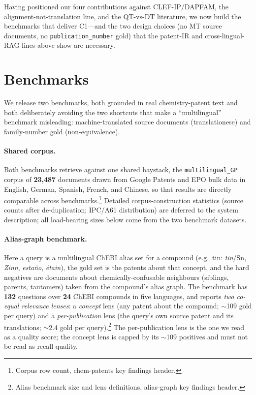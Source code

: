 \documentclass[11pt]{article}
\begin{document}
Having positioned our four contributions against CLEF-IP/DAPFAM, the
alignment-not-translation line, and the QT-vs-DT literature, we now build the
benchmarks that deliver C1---and the two design choices (no MT source
documents, no \texttt{publication\_number} gold) that the patent-IR and
cross-lingual-RAG lines above show are necessary.

\section{Benchmarks}
\label{sec:benchmarks}

We release two benchmarks, both grounded in real chemistry-patent text and both
deliberately avoiding the two shortcuts that make a ``multilingual'' benchmark
misleading: machine-translated source documents (translationese) and
family-number gold (non-equivalence).

\paragraph{Shared corpus.}
Both benchmarks retrieve against one shared haystack, the
\texttt{multilingual\_GP} corpus of \textbf{23{,}487} documents drawn from
Google Patents and EPO bulk data in English, German, Spanish, French, and
Chinese, so that results are directly comparable across benchmarks.\footnote{%
Corpus row count, chem-patents key findings header.} Detailed
corpus-construction statistics (source counts after de-duplication; IPC/A61
distribution) are deferred to the system description; all load-bearing sizes
below come from the two benchmark datasets.

\paragraph{Alias-graph benchmark.}
Here a query is a multilingual ChEBI alias set for a compound (e.g.\ tin:
\emph{tin}/Sn, \emph{Zinn}, \emph{esta\~no}, \emph{\'etain}), the gold set is the
patents about that concept, and the hard negatives are documents about
chemically-confusable neighbours (siblings, parents, tautomers) taken from the
compound's alias graph. The benchmark has \textbf{132} questions over
\textbf{24} ChEBI compounds in five languages, and reports \emph{two co-equal
relevance lenses}: a \emph{concept} lens (any patent about the compound;
$\sim$109 gold per query) and a \emph{per-publication} lens (the query's own
source patent and its translations; $\sim$2.4 gold per query).\footnote{Alias
benchmark size and lens definitions, alias-graph key findings header.} The
per-publication lens is the one we read as a quality score; the concept lens is
capped by its $\sim$109 positives and must not be read as recall quality.
\end{document}
